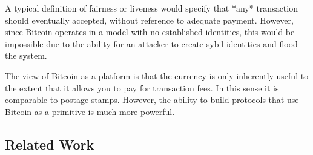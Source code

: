 A typical definition of fairness or liveness would specify that *any* transaction should eventually accepted, without reference to adequate payment. However, since Bitcoin operates in a model with no established identities, this would be impossible due to the ability for an attacker to create sybil identities and flood the system.

The view of Bitcoin as a platform is that the currency is only inherently useful to the extent that it allows you to pay for transaction fees. In this sense it is comparable to postage stamps. However, the ability to build protocols that use Bitcoin as a primitive is much more powerful.

\subsection{Related Work}
